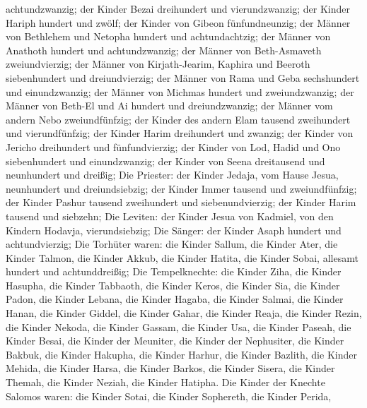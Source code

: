 achtundzwanzig;  der Kinder Bezai dreihundert und
vierundzwanzig;  der Kinder Hariph hundert und zwölf;
 der Kinder von Gibeon fünfundneunzig;  der
Männer von Bethlehem und Netopha hundert und achtundachtzig;
 der Männer von Anathoth hundert und achtundzwanzig;
 der Männer von Beth-Asmaveth zweiundvierzig; 
der Männer von Kirjath-Jearim, Kaphira und Beeroth siebenhundert und
dreiundvierzig;  der Männer von Rama und Geba sechshundert
und einundzwanzig;  der Männer von Michmas hundert und
zweiundzwanzig;  der Männer von Beth-El und Ai hundert und
dreiundzwanzig;  der Männer vom andern Nebo zweiundfünfzig;
 der Kinder des andern Elam tausend zweihundert und
vierundfünfzig;  der Kinder Harim dreihundert und zwanzig;
 der Kinder von Jericho dreihundert und fünfundvierzig;
 der Kinder von Lod, Hadid und Ono siebenhundert und
einundzwanzig;  der Kinder von Seena dreitausend und
neunhundert und dreißig;  Die Priester: der Kinder Jedaja,
vom Hause Jesua, neunhundert und dreiundsiebzig;  der
Kinder Immer tausend und zweiundfünfzig;  der Kinder Pashur
tausend zweihundert und siebenundvierzig;  der Kinder Harim
tausend und siebzehn;  Die Leviten: der Kinder Jesua von
Kadmiel, von den Kindern Hodavja, vierundsiebzig;  Die
Sänger: der Kinder Asaph hundert und achtundvierzig;  Die
Torhüter waren: die Kinder Sallum, die Kinder Ater, die Kinder Talmon,
die Kinder Akkub, die Kinder Hatita, die Kinder Sobai, allesamt hundert
und achtunddreißig;  Die Tempelknechte: die Kinder Ziha,
die Kinder Hasupha, die Kinder Tabbaoth,  die Kinder Keros,
die Kinder Sia, die Kinder Padon,  die Kinder Lebana, die
Kinder Hagaba, die Kinder Salmai,  die Kinder Hanan, die
Kinder Giddel, die Kinder Gahar,  die Kinder Reaja, die
Kinder Rezin, die Kinder Nekoda,  die Kinder Gassam, die
Kinder Usa, die Kinder Paseah,  die Kinder Besai, die
Kinder der Meuniter, die Kinder der Nephusiter,  die Kinder
Bakbuk, die Kinder Hakupha, die Kinder Harhur,  die Kinder
Bazlith, die Kinder Mehida, die Kinder Harsa,  die Kinder
Barkos, die Kinder Sisera, die Kinder Themah,  die Kinder
Neziah, die Kinder Hatipha.  Die Kinder der Knechte Salomos
waren: die Kinder Sotai, die Kinder Sophereth, die Kinder Perida,
